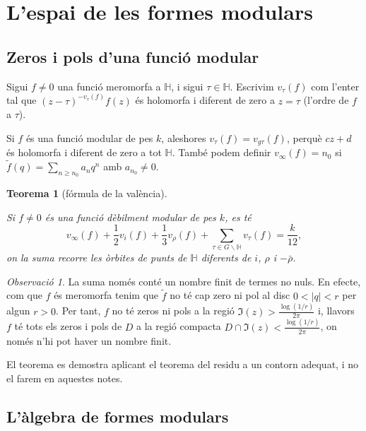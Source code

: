\documentclass[
  letterpaper,
  DIV=11,
  numbers=noendperiod]{scrreprt}
\theoremstyle{plain}
\newtheorem{theorem}{Teorema}[chapter]
\theoremstyle{plain}
\theoremstyle{definition}
\theoremstyle{plain}
\theoremstyle{plain}
\theoremstyle{definition}
\theoremstyle{remark}
\newtheorem{refremark}{Observació}[chapter]
\begin{document}
\section{L'espai de les formes
modulars}\label{lespai-de-les-formes-modulars}

\subsection{Zeros i pols d'una funció
modular}\label{zeros-i-pols-duna-funciuxf3-modular}

Sigui \(f\neq 0\) una funció meromorfa a \(\mathbb{H}\), i sigui
\(\tau\in\mathbb{H}\). Escrivim \(v_{\tau}(f)\) com l'enter tal que
\((z-\tau)^{- v_{\tau}(f)} f(z)\) és holomorfa i diferent de zero a
\(z=\tau\) (l'ordre de \(f\) a \(\tau\)).

Si \(f\) és una funció modular de pes \(k\), aleshores
\(v_\tau(f)=v_{g\tau}(f)\), perquè \(cz+d\) és holomorfa i diferent de
zero a tot \(\mathbb{H}\). També podem definir \(v_\infty(f)=n_0\) si
\(\tilde f(q)=\sum_{n\geq n_0} a_nq^n\) amb \(a_{n_0}\neq 0\).

\begin{theorem}[fórmula de la
valència]\protect\hypertarget{thm-valencia}{}\label{thm-valencia}

Si \(f\neq 0\) és una funció dèbilment modular de pes \(k\), es té
\[v_{\infty}(f) + \frac{1}{2} v_{i}(f) +\frac{1}{3}v_{\rho}(f) +\sum_{\tau\in G\backslash \mathbb{H}} v_{\tau}(f) = \frac{k}{12},
\] on la suma recorre les òrbites de punts de \(\mathbb{H}\) diferents
de \(i\), \(\rho\) i \(-\bar\rho\).

\end{theorem}

\begin{refremark}
La suma només conté un nombre finit de termes no nuls. En efecte, com
que \(f\) és meromorfa tenim que \(\tilde f\) no té cap zero ni pol al
disc \(0<|q|<r\) per algun \(r >0\). Per tant, \(f\) no té zeros ni pols
a la regió \(\Im(z)>\frac{\log(1/r)}{2\pi}\) i, llavors \(f\) té tots
els zeros i pols de \(D\) a la regió compacta
\(D\cap \Im(z)< \frac{\log(1/r)}{2\pi}\), on només n'hi pot haver un
nombre finit.

\label{rem-}

\end{refremark}

El teorema es demostra aplicant el teorema del residu a un contorn
adequat, i no el farem en aquestes notes.

\subsection{L'àlgebra de formes
modulars}\label{luxe0lgebra-de-formes-modulars}
\end{document}

